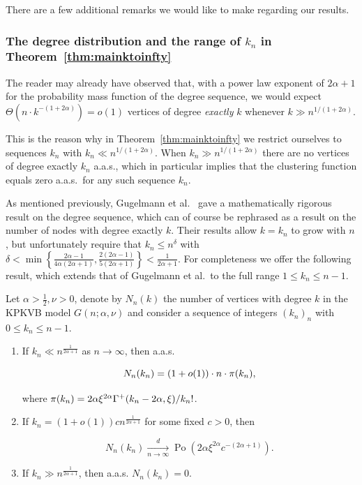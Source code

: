 There are a few additional remarks we would like to make regarding our results.

\subsubsection{The degree distribution and the range of $k_n$ in Theorem~\ref{thm:mainktoinfty}}

The reader may already have observed that, with a power law exponent of $2\alpha+1$ for the probability mass function of 
the degree sequence, we would expect $\Theta( n \cdot k^{-(1+2\alpha)} ) = o(1)$ vertices of degree {\em exactly} $k$ whenever
$k \gg n^{1/(1+2\alpha)}$.

This is the reason why in Theorem~\ref{thm:mainktoinfty} we restrict ourselves to 
sequences $k_n$ with $k_n \ll n^{1/(1+2\alpha)}$. 
When  $k_n \gg n^{1/(1+2\alpha)}$ there are no vertices of degree exactly $k_n$ a.a.s., which in particular
implies that the clustering function equals zero a.a.s.~for any such sequence $k_n$.

As mentioned previously, Gugelmann et al.~\cite{gugelmann2012random} gave a mathematically rigorous result on the degree sequence, which can of course be rephrased as a result on the number of nodes with degree exactly $k$. 
Their results allow $k = k_n$ to grow with $n$, but unfortunately require that $k_n \leq n^\delta$ with 
$\delta < \min\left\{\frac{2\alpha-1}{4\alpha(2\alpha +1)}, \frac{2(2\alpha -1)}{5(2\alpha + 1)}\right\} < \frac{1}{2\alpha + 1}$.
For completeness we offer the following result, which extends that of Gugelmann et al.~to the full range $1 \le k_n \le n-1$. 

\begin{theorem}\label{thm:degrees_hyperbolic}
Let $\alpha >\frac{1}{2}, \nu > 0$, denote by $N_n(k)$ the number of vertices with degree $k$ in the KPKVB model $G(n;\alpha,\nu)$ and 
consider a sequence of integers $(k_n)_n$ with $0 \leq k_n \leq n-1$.
\begin{enumerate}
\item If $k_n \ll n^{\frac{1}{2\alpha+1}} $ as $n\rightarrow \infty$, then a.a.s.

$$N_n(k_n) = (1+o(1)) \cdot n \cdot {\pi}(k_n),$$

where ${\pi}(k_n) = 2\alpha \xi^{2\alpha}\Gamma^+(k_n-2\alpha,\xi)/k_n!$.

\item If $k_n = (1+o(1))c n^{\frac{1}{2\alpha+1}}$ for some fixed $c >0$, then

$$ N_n(k_n) \xrightarrow[n\rightarrow\infty]{d} \operatorname{Po}(2\alpha \xi^{2\alpha} c^{-(2\alpha+1)}). $$

\item If $k_n \gg n^{\frac{1}{2\alpha+1}}$, then a.a.s. $N_n(k_n) = 0$.
\end{enumerate}
\end{theorem}




